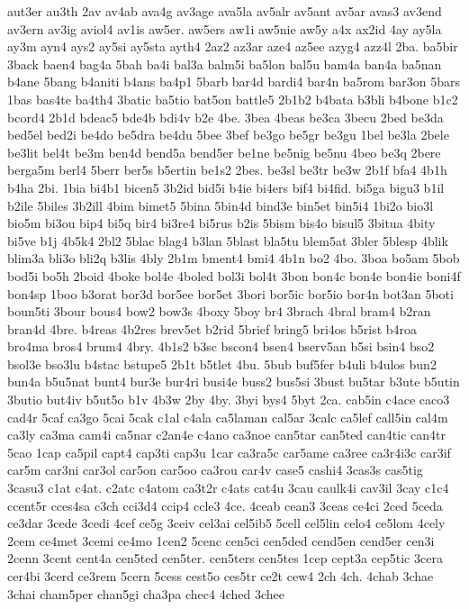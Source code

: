 {aut3er
au3th
2av
av4ab
ava4g
av3age
ava5la
av5alr
av5ant
av5ar
avas3
av3end
av3ern
av3ig
aviol4
av1is
aw5er.
aw5ers
aw1i
aw5nie
aw5y
a4x
ax2id
4ay
ay5la
ay3m
ayn4
ays2
ay5si
ay5sta
ayth4
2az2
az3ar
aze4
az5ee
azyg4
azz4l
2ba.
ba5bir
3back
baen4
bag4a
5bah
ba4i
bal3a
balm5i
ba5lon
bal5u
bam4a
ban4a
ba5nan
b4ane
5bang
b4aniti
b4ans
ba4p1
5barb
bar4d
bardi4
bar4n
ba5rom
bar3on
5bars
1bas
bas4te
ba4th4
3batic
ba5tio
bat5on
battle5
2b1b2
b4bata
b3bli
b4bone
b1c2
bcord4
2b1d
bdeac5
bde4b
bdi4v
b2e
4be.
3bea
4beas
be3ca
3becu
2bed
be3da
bed5el
bed2i
be4do
be5dra
be4du
5bee
3bef
be3go
be5gr
be3gu
1bel
be3la
2bele
be3lit
bel4t
be3m
ben4d
bend5a
bend5er
be1ne
be5nig
be5nu
4beo
be3q
2bere
berga5m
berl4
5berr
ber5s
b5ertin
be1s2
2bes.
be3sl
be3tr
be3w
2b1f
bfa4
4b1h
b4ha
2bi.
1bia
bi4b1
bicen5
3b2id
bid5i
b4ie
bi4ers
bif4
bi4fid.
bi5ga
bigu3
b1il
b2ile
5biles
3b2ill
4bim
bimet5
5bina
5bin4d
bind3e
bin5et
bin5i4
1bi2o
bio3l
bio5m
bi3ou
bip4
bi5q
bir4
bi3re4
bi5rus
b2is
5bism
bis4o
bisul5
3bitua
4bity
bi5ve
b1j
4b5k4
2bl2
5blac
blag4
b3lan
5blast
bla5tu
blem5at
3bler
5blesp
4blik
blim3a
bli3o
bli2q
b3lis
4bly
2b1m
bment4
bmi4
4b1n
bo2
4bo.
3boa
bo5am
5bob
bod5i
bo5h
2boid
4boke
bol4e
4boled
bol3i
bol4t
3bon
bon4c
bon4e
bon4ie
boni4f
bon4sp
1boo
b3orat
bor3d
bor5ee
bor5et
3bori
bor5ic
bor5io
bor4n
bot3an
5boti
boun5ti
3bour
bous4
bow2
bow3s
4boxy
5boy
br4
3brach
4bral
bram4
b2ran
bran4d
4bre.
b4reas
4b2res
brev5et
b2rid
5brief
bring5
bri4os
b5rist
b4roa
bro4ma
bros4
brum4
4bry.
4b1s2
b3sc
bscon4
bsen4
bserv5an
b5si
bsin4
bso2
bsol3e
bso3lu
b4stac
bstupe5
2b1t
b5tlet
4bu.
5bub
buf5fer
b4uli
b4ulos
bun2
bun4a
b5u5nat
bunt4
bur3e
bur4ri
busi4e
buss2
bus5si
3bust
bu5tar
b3ute
b5utin
3butio
but4iv
b5ut5o
b1v
4b3w
2by
4by.
3byi
bys4
5byt
2ca.
cab5in
c4ace
caco3
cad4r
5caf
ca3go
5cai
5cak
c1al
c4ala
ca5laman
cal5ar
3calc
ca5lef
call5in
cal4m
ca3ly
ca3ma
cam4i
ca5nar
c2an4e
c4ano
ca3noe
can5tar
can5ted
can4tic
can4tr
5cao
1cap
ca5pil
capt4
cap3ti
cap3u
1car
ca3ra5c
car5ame
ca3ree
ca3r4i3c
car3if
car5m
car3ni
car3ol
car5on
car5oo
ca3rou
car4v
case5
cashi4
3cas3s
cas5tig
3casu3
c1at
c4at.
c2atc
c4atom
ca3t2r
c4ats
cat4u
3cau
caulk4i
cav3il
3cay
c1c4
ccent5r
cces4sa
c3ch
cci3d4
ccip4
ccle3
4ce.
4ceab
cean3
3ceas
ce4ci
2ced
5ceda
ce3dar
3cede
3cedi
4cef
ce5g
3ceiv
cel3ai
cel5ib5
5cell
cel5lin
celo4
ce5lom
4cely
2cem
ce4met
3cemi
ce4mo
1cen2
5cenc
cen5ci
cen5ded
cend5en
cend5er
cen3i
2cenn
3cent
cent4a
cen5ted
cen5ter.
cen5ters
cen5tes
1cep
cept3a
cep5tic
3cera
cer4bi
3cerd
ce3rem
5cern
5cess
cest5o
ces5tr
ce2t
cew4
2ch
4ch.
4chab
3chae
3chai
cham5per
chan5gi
cha3pa
chec4
4ched
3chee
}
